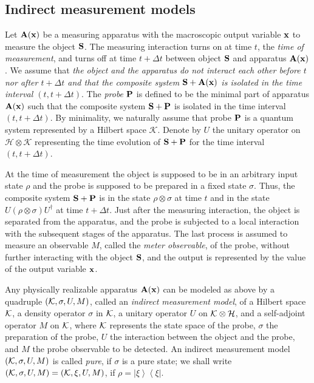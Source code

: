 \documentclass[graybox]{svmult}
\newcommand{\bA}{{\bf A}}
\newcommand{\bP}{{\bf P}}
\newcommand{\bS}{{\bf S}}
\newcommand{\cH}{{\mathcal H}}
\newcommand{\cK}{{\mathcal K}}
\newcommand{\da}{\dagger}
\newcommand{\rh}{\rho}
\newcommand{\si}{\sigma}
\newcommand{\De}{\Delta}
\newcommand{\bx}{{\bf x}}
\newcommand{\bra}[1]{\left\langle#1\right|}
\newcommand{\ket}[1]{\left|#1\right\rangle}
\begin{document}
\subsection{Indirect measurement models}

Let $\bA(\bx)$ be a measuring apparatus with the macroscopic 
output variable $\bx$ to measure the object $\bS$.  
The measuring
interaction turns on at time $t$, the {\em time of measurement}, and turns off at
time $t+\De t$ between  object $\bS$ and apparatus $\bA(\bx)$.  
We assume that {\em the object and the apparatus do not 
interact each other before $t$ nor after $t+\De t$ and that 
the composite system $\bS+\bA(\bx)$ is isolated in the
time interval $(t,t+\De t)$}.  The {\em probe} $\bP$ is
defined to be the minimal part of apparatus $\bA(\bx)$ 
such that the composite system $\bS+\bP$ is isolated in the time interval
$(t,t+\De t)$. By minimality, we naturally assume that probe $\bP$ is a 
quantum system represented by a Hilbert space $\cK$.  
Denote by $U$ the unitary operator on $\cH\otimes\cK$ representing 
the time evolution of $\bS+\bP$ for the time interval $(t,t+\Delta t)$.  

At the time of measurement the object is supposed to
be in an arbitrary input state $\rh$
and the probe is
supposed to be prepared in a fixed state $\si$.
Thus, the composite system $\bS+\bP$ is in the state $\rh\otimes\si$
at time $t$ and in the state $U(\rh\otimes\si)U^{\da}$ at time $t+\De t$. 
Just after the measuring interaction, the object is separated from the apparatus,
and the probe is subjected to a local interaction with the subsequent stages of the
apparatus.  The last process is assumed to measure an observable $M$, called the
{\em meter observable}, of the probe, without further interacting with the object $\bS$,
and the output is represented by the value of the output variable $\bx$.  

\sloppy
Any physically realizable apparatus $\bA(\bx)$
can be modeled as above by a quadruple
$({\cal K},\si,U,M)$, called an {\em indirect measurement model}, 
of a Hilbert space
${\cal K}$,  a density operator $\si$ in ${\cal K}$, 
a unitary operator $U$ on ${\cal K}\otimes{\cal H}$,
and a self-adjoint operator $M$ on ${\cal K}$, where
${\cal K}$ represents the state space of the probe,
$\si$ the preparation of the probe,
$U$ the interaction between the object and the probe,
and $M$ the probe observable to be detected.
An indirect measurement model $({\cal K},\si,U,M)$
is called {\em pure}, if $\si$ is a pure state; we shall
write $({\cal K},\si,U,M)=({\cal K},\xi,U,M)$, if
$\rh=\ket{\xi}\bra{\xi}$.
 
\end{document}
